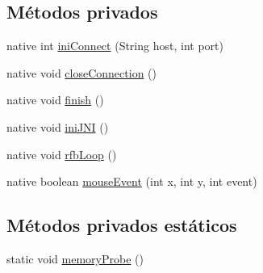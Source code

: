 \subsection*{Métodos privados}
\begin{DoxyCompactItemize}
\item 
native int \hyperlink{classes_1_1ucm_1_1tfg_1_1controlremotolinux_1_1client_1_1model_1_1VncBridgeJNI_afa4a64765c1886d310d4754bfe055f0e}{ini\-Connect} (String host, int port)
\item 
native void \hyperlink{classes_1_1ucm_1_1tfg_1_1controlremotolinux_1_1client_1_1model_1_1VncBridgeJNI_a07a190841ef48a9f9af38c4f21400ccd}{close\-Connection} ()
\item 
native void \hyperlink{classes_1_1ucm_1_1tfg_1_1controlremotolinux_1_1client_1_1model_1_1VncBridgeJNI_a168d25f650d5720435d8a0f4412b22e4}{finish} ()
\item 
native void \hyperlink{classes_1_1ucm_1_1tfg_1_1controlremotolinux_1_1client_1_1model_1_1VncBridgeJNI_aded9e66b1ef314d478cf3b4451fd7ccf}{ini\-J\-N\-I} ()
\item 
native void \hyperlink{classes_1_1ucm_1_1tfg_1_1controlremotolinux_1_1client_1_1model_1_1VncBridgeJNI_a0de32509029cf13be428f7892efeb2c7}{rfb\-Loop} ()
\item 
native boolean \hyperlink{classes_1_1ucm_1_1tfg_1_1controlremotolinux_1_1client_1_1model_1_1VncBridgeJNI_adeb93e2ffe31de0b4f5d4ee974171c0b}{mouse\-Event} (int x, int y, int event)
\end{DoxyCompactItemize}
\subsection*{Métodos privados estáticos}
\begin{DoxyCompactItemize}
\item 
static void \hyperlink{classes_1_1ucm_1_1tfg_1_1controlremotolinux_1_1client_1_1model_1_1VncBridgeJNI_aa95ade688748fdb8fcbd5984fcc60c6f}{memory\-Probe} ()
\end{DoxyCompactItemize}
